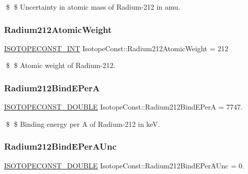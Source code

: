 \$ \$ Uncertainty in atomic mass of Radium-\/212 in amu. \mbox{\label{group___isotope_const-_radium-_ra212_ga81054fea513d4bd097e7bad81a52c705}} 
\subsubsection{\texorpdfstring{Radium212\+Atomic\+Weight}{Radium212AtomicWeight}}
{\footnotesize\ttfamily \mbox{\hyperlink{group___isotope_const-_macros_ga5f18360b3e99483a35c32d789e62621c}{I\+S\+O\+T\+O\+P\+E\+C\+O\+N\+S\+T\+\_\+\+I\+NT}} Isotope\+Const\+::\+Radium212\+Atomic\+Weight = 212}

\$ \$ Atomic weight of Radium-\/212. \mbox{\label{group___isotope_const-_radium-_ra212_ga47d4d96e00461733d0cb2fd078a8ff03}} 
\subsubsection{\texorpdfstring{Radium212\+Bind\+E\+PerA}{Radium212BindEPerA}}
{\footnotesize\ttfamily \mbox{\hyperlink{group___isotope_const-_macros_ga8f45a7272ce02c0b4c65c44636ed719a}{I\+S\+O\+T\+O\+P\+E\+C\+O\+N\+S\+T\+\_\+\+D\+O\+U\+B\+LE}} Isotope\+Const\+::\+Radium212\+Bind\+E\+PerA = 7747.}

\$ \$ Binding energy per A of Radium-\/212 in keV. \mbox{\label{group___isotope_const-_radium-_ra212_ga9755eb7216378acaec618a8b1740defb}} 
\subsubsection{\texorpdfstring{Radium212\+Bind\+E\+Per\+A\+Unc}{Radium212BindEPerAUnc}}
{\footnotesize\ttfamily \mbox{\hyperlink{group___isotope_const-_macros_ga8f45a7272ce02c0b4c65c44636ed719a}{I\+S\+O\+T\+O\+P\+E\+C\+O\+N\+S\+T\+\_\+\+D\+O\+U\+B\+LE}} Isotope\+Const\+::\+Radium212\+Bind\+E\+Per\+A\+Unc = 0.}

